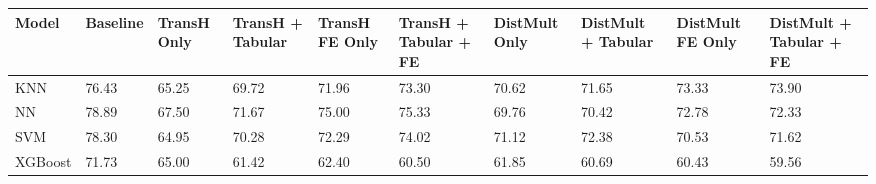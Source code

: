 \begin{tabular}{llllllllll}
\toprule
Model & Baseline & TransH Only & TransH + Tabular & TransH FE Only & TransH + Tabular + FE & DistMult Only & DistMult + Tabular & DistMult FE Only & DistMult + Tabular + FE \\
\midrule
KNN & 76.43 & 65.25 & 69.72 & 71.96 & 73.30 & 70.62 & 71.65 & 73.33 & 73.90 \\
NN & 78.89 & 67.50 & 71.67 & 75.00 & 75.33 & 69.76 & 70.42 & 72.78 & 72.33 \\
SVM & 78.30 & 64.95 & 70.28 & 72.29 & 74.02 & 71.12 & 72.38 & 70.53 & 71.62 \\
XGBoost & 71.73 & 65.00 & 61.42 & 62.40 & 60.50 & 61.85 & 60.69 & 60.43 & 59.56 \\
\bottomrule
\end{tabular}
